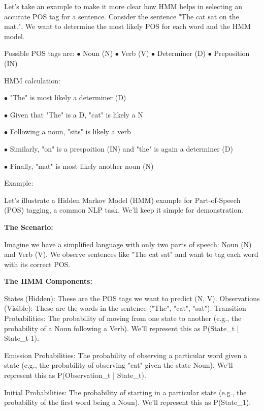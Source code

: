     Let's take an example to make it more clear how HMM helps in selecting an accurate POS tag for a sentence.
    Consider the sentence "The cat sat on the mat.", We want to determine the most likely POS for each word and the HMM model.
    
    Possible POS tags are: \hspace{1cm} $\bullet$ Noun (N) \hspace{1cm} $\bullet$ Verb (V) \hspace{1cm} $\bullet$ Determiner (D) \hspace{1cm} $\bullet$ Preposition (IN)
    
    HMM calculation: 
    
    $\bullet$ "The" is most likely a determiner (D)
    
    $\bullet$ Given that "The" is a D, "cat" is likely a N
    
    $\bullet$ Following a noun, "sits" is likely a verb
    
    $\bullet$ Similarly, "on" is a prespoition (IN) and "the" is again a determiner (D)
    
    $\bullet$ Finally, "mat" is most likely another noun (N)
    \vspace{1cm}

Example:

Let's illustrate a Hidden Markov Model (HMM) example for Part-of-Speech (POS) tagging, a common NLP task.  We'll keep it simple for demonstration.

\textbf{The Scenario:}

Imagine we have a simplified language with only two parts of speech: Noun (N) and Verb (V).  We observe sentences like "The cat sat" and want to tag each word with its correct POS.

\textbf{The HMM Components:}

States (Hidden): These are the POS tags we want to predict (N, V).
Observations (Visible): These are the words in the sentence ("The", "cat", "sat").
Transition Probabilities: The probability of moving from one state to another (e.g., the probability of a Noun following a Verb). We'll represent this as P(State_t | State_t-1).

Emission Probabilities: The probability of observing a particular word given a state (e.g., the probability of observing "cat" given the state Noun). We'll represent this as P(Observation_t | State_t).

Initial Probabilities: The probability of starting in a particular state (e.g., the probability of the first word being a Noun). We'll represent this as P(State_1).

